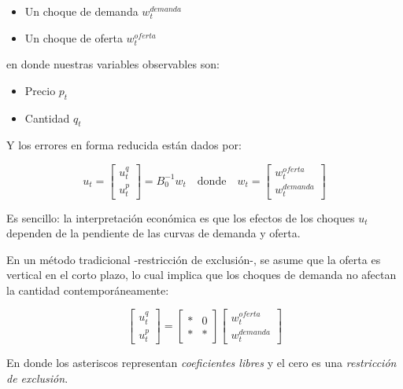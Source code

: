 \documentclass[
]{book}
\providecommand{\tightlist}{%
  \setlength{\itemsep}{0pt}\setlength{\parskip}{0pt}}
\begin{document}
\begin{itemize}
\tightlist
\item
  Un choque de demanda \(w_t^{demanda}\)
\item
  Un choque de oferta \(w_t^{oferta}\)
\end{itemize}

en donde nuestras variables observables son:

\begin{itemize}
\tightlist
\item
  Precio \(p_t\)
\item
  Cantidad \(q_t\)
\end{itemize}

Y los errores en forma reducida están dados por:

\begin{equation}
u_t = \begin{bmatrix} u_t^q \\ u_t^p \end{bmatrix} = B_0^{-1} w_t 
      \quad \text{donde} \quad 
w_t = \begin{bmatrix} w_t^{oferta} \\ w_t^{demanda} \end{bmatrix}
\end{equation}

Es sencillo: la interpretación económica es que los efectos de los choques \(u_t\) dependen de la pendiente de las curvas de demanda y oferta.

En un método tradicional -restricción de exclusión-, se asume que la oferta es vertical en el corto plazo, lo cual implica que los choques de demanda no afectan la cantidad contemporáneamente:

\begin{equation}
\begin{bmatrix} u_t^q \\ u_t^p \end{bmatrix} = 
\begin{bmatrix} \ast & 0 \\
                \ast & \ast 
                \end{bmatrix}
\begin{bmatrix} w_t^{oferta} \\ w_t^{demanda} \end{bmatrix}
\end{equation}

En donde los asteriscos representan \emph{coeficientes libres} y el cero es una \emph{restricción de exclusión}.
\end{document}
